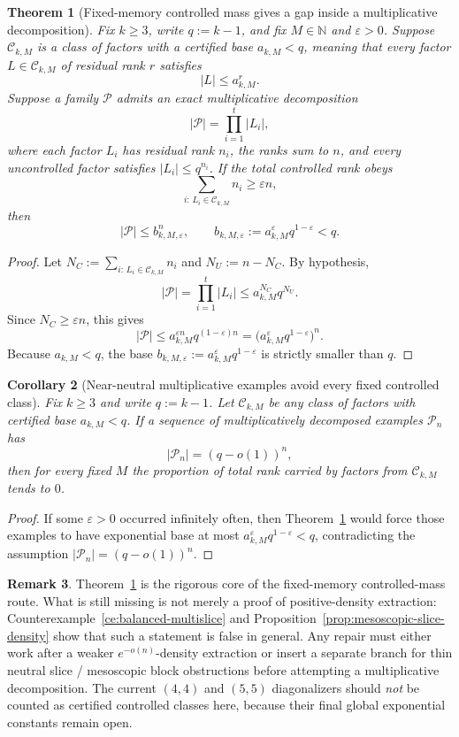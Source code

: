 \documentclass[11pt]{article}
\newtheorem{theorem}{Theorem}[section]
\newtheorem{corollary}[theorem]{Corollary}
\theoremstyle{definition}
\newtheorem{remark}[theorem]{Remark}
\newcommand{\PP}{\mathcal{P}}
\newcommand{\eps}{\varepsilon}
\newcommand{\N}{\mathbb{N}}
\newcommand{\1}{\mathbf{1}}
\begin{document}
\begin{theorem}[Fixed-memory controlled mass gives a gap inside a multiplicative decomposition]\label{thm:controlled-mass-gap}
Fix $k\ge 3$, write $q:=k-1$, and fix $M\in \N$ and $\eps>0$. Suppose $\mathcal C_{k,M}$ is a class of factors with a certified base $a_{k,M}<q$, meaning that every factor $L\in \mathcal C_{k,M}$ of residual rank $r$ satisfies
\[
|L|\le a_{k,M}^r.
\]
Suppose a family $\PP$ admits an exact multiplicative decomposition
\[
|\PP|=\prod_{i=1}^t |L_i|,
\]
where each factor $L_i$ has residual rank $n_i$, the ranks sum to $n$, and every uncontrolled factor satisfies $|L_i|\le q^{n_i}$. If the total controlled rank obeys
\[
\sum_{i:\,L_i\in \mathcal C_{k,M}} n_i\ge \eps n,
\]
then
\[
|\PP|\le b_{k,M,\eps}^n,
\qquad
b_{k,M,\eps}:=a_{k,M}^{\eps}q^{1-\eps}<q.
\]
\end{theorem}

\begin{proof}
Let $N_C:=\sum_{i:\,L_i\in \mathcal C_{k,M}} n_i$ and $N_U:=n-N_C$. By hypothesis,
\[
|\PP|=\prod_{i=1}^t |L_i|\le a_{k,M}^{N_C}q^{N_U}.
\]
Since $N_C\ge \eps n$, this gives
\[
|\PP|\le a_{k,M}^{\eps n}q^{(1-\eps)n}=\bigl(a_{k,M}^{\eps}q^{1-\eps}\bigr)^n.
\]
Because $a_{k,M}<q$, the base $b_{k,M,\eps}:=a_{k,M}^{\eps}q^{1-\eps}$ is strictly smaller than $q$.
\end{proof}

\begin{corollary}[Near-neutral multiplicative examples avoid every fixed controlled class]\label{cor:controlled-mass-contrapositive}
Fix $k\ge 3$ and write $q:=k-1$. Let $\mathcal C_{k,M}$ be any class of factors with certified base $a_{k,M}<q$. If a sequence of multiplicatively decomposed examples $\PP_n$ has
\[
|\PP_n|=(q-o(1))^n,
\]
then for every fixed $M$ the proportion of total rank carried by factors from $\mathcal C_{k,M}$ tends to $0$.
\end{corollary}

\begin{proof}
If some $\eps>0$ occurred infinitely often, then Theorem~\ref{thm:controlled-mass-gap} would force those examples to have exponential base at most $a_{k,M}^{\eps}q^{1-\eps}<q$, contradicting the assumption $|\PP_n|=(q-o(1))^n$.
\end{proof}

\begin{remark}
Theorem~\ref{thm:controlled-mass-gap} is the rigorous core of the fixed-memory controlled-mass route. What is still missing is not merely a proof of positive-density extraction: Counterexample~\ref{ce:balanced-multislice} and Proposition~\ref{prop:mesoscopic-slice-density} show that such a statement is false in general. Any repair must either work after a weaker $e^{-o(n)}$-density extraction or insert a separate branch for thin neutral slice / mesoscopic block obstructions before attempting a multiplicative decomposition. The current $(4,4)$ and $(5,5)$ diagonalizers should \emph{not} be counted as certified controlled classes here, because their final global exponential constants remain open.
\end{remark}
\end{document}
